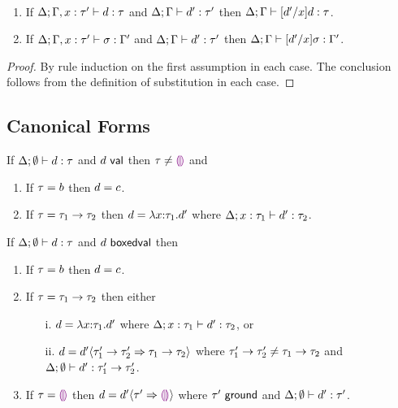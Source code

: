\vspace{5pt}
\begin{lem}[Substitution] \label{thm:substitution}~
\begin{enumerate}[nolistsep]
\item If $\Delta; \Gamma, x : \tau' \vdash d : \tau$ and $\Delta; \Gamma \vdash d' : \tau'$ then $\Delta; \Gamma \vdash [d'/x]d : \tau$.
\item If $\Delta; \Gamma, x : \tau' \vdash \sigma : \Gamma'$ and $\Delta; \Gamma \vdash d' : \tau'$ then $\Delta; \Gamma \vdash [d'/x]\sigma : \Gamma'$.
\end{enumerate}
\end{lem}
\begin{proof} By rule induction on the first assumption in each case. The conclusion follows from the definition of substitution in each case. \end{proof}

\subsection{Canonical Forms}
\begin{lem}\label{thm:canonincal-value-forms}
  If $\Delta; \emptyset \vdash d : \tau$ and $d~\mathsf{val}$
  then $\tau\neq\textcolor{violet}{\llparenthesis}\textcolor{violet}{\rrparenthesis}$ and
  \begin{enumerate}[nolistsep]
    \item If $\tau=b$ then $d=c$.
    \item If $\tau=\tau_1 \rightarrow \tau_2$
          then $d=\lambda x{:}\tau_1.d'$
          where $\Delta; x : \tau_1 \vdash d' : \tau_2$.
  \end{enumerate}
\end{lem}

\begin{lem}\label{thm:canonical-boxed-forms}
  If $\Delta; \emptyset \vdash d : \tau$ and $d~\mathsf{boxedval}$
  then
  \begin{enumerate}[nolistsep]
    \item If $\tau=b$ then $d=c$.
    \item If $\tau=\tau_1 \rightarrow \tau_2$ then either
      \begin{enumerate}
        \item[i.]
          $d=\lambda x{:}\tau_1.d'$
          where $\Delta; x : \tau_1 \vdash d' : \tau_2$, or
        \item[ii.]
          $d=d' \langle{\tau_1' \rightarrow \tau_2'}\Rightarrow{\tau_1 \rightarrow \tau_2}\rangle$
          where $\tau_1' \rightarrow \tau_2'\neq\tau_1 \rightarrow \tau_2$
          and $\Delta; \emptyset \vdash d' : \tau_1' \rightarrow \tau_2'$.
      \end{enumerate}
    \item If $\tau=\textcolor{violet}{\llparenthesis}\textcolor{violet}{\rrparenthesis}$
          then $d=d' \langle{\tau'}\Rightarrow{\textcolor{violet}{\llparenthesis}\textcolor{violet}{\rrparenthesis}}\rangle$
          where $\tau'~\mathsf{ground}$
          and $\Delta; \emptyset \vdash d' : \tau'$.
  \end{enumerate}
\end{lem}

